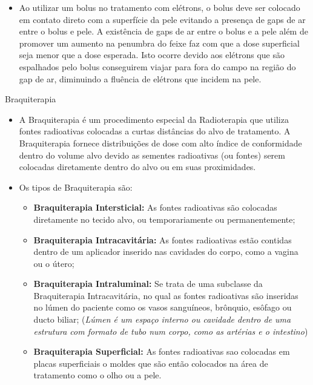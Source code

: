 \documentclass[11pt,a4paper]{article}
\newcounter{exemplo}
\begin{document}
\begin{exemplo}
\begin{itemize}
        \item Ao utilizar um bolus no tratamento com elétrons, o bolus deve ser colocado em contato direto com a  superfície da pele evitando a presença de gaps de ar entre o bolus e pele. A existência de gaps de ar entre o bolus e a pele além de promover um aumento na penumbra do feixe faz com que a dose superficial seja menor que a dose esperada. Isto ocorre devido aos elétrons que são espalhados pelo bolus conseguirem viajar para fora do campo na região do gap de ar, diminuindo a fluência de elétrons que incidem na pele.

    \end{itemize}
\end{exemplo}

\begin{exemplo}[8. Braquiterapia]
    \textcolor{CarnationPink}{Braquiterapia}
    \begin{itemize}
        \item A Braquiterapia é um procedimento especial da Radioterapia que utiliza fontes radioativas colocadas a curtas distâncias do alvo de tratamento. A Braquiterapia fornece distribuições de dose com alto índice de conformidade dentro do volume alvo devido as sementes radioativas (ou fontes) serem colocadas diretamente dentro do alvo ou em suas proximidades.
        
        \item Os tipos de Braquiterapia são:
        
            \begin{itemize}[label=\textopenbullet]
                \item \textcolor{CarnationPink}{\textbf{Braquiterapia Intersticial:}} As fontes radioativas são colocadas diretamente no tecido alvo, ou temporariamente ou permanentemente;
                \item \textcolor{CarnationPink}{\textbf{Braquiterapia Intracavitária:}} As fontes radioativas estão contidas dentro de um aplicador inserido nas cavidades do corpo, como a vagina ou o útero;
                \item \textcolor{CarnationPink}{\textbf{Braquiterapia Intraluminal:}} Se trata de uma subclasse da Braquiterapia Intracavitária, no qual as fontes radioativas são inseridas no lúmen do paciente como os vasos sanguíneos, brônquio, esôfago ou ducto biliar; (\textit{Lúmen é um espaço interno ou cavidade dentro de uma estrutura com formato de tubo num corpo, como as artérias e o intestino})
                \item \textcolor{CarnationPink}{\textbf{Braquiterapia Superficial:}} As fontes radioativas sao colocadas em placas superficiais o moldes que são então colocados na área de tratamento como o olho ou a pele. 
            \end{itemize}


\end{itemize}
\end{exemplo}
\end{document}
